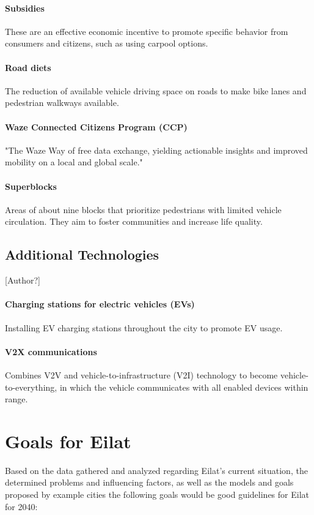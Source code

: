 \documentclass[12pt]{article}                         %
\begin{document}
\paragraph{Subsidies} These are an effective economic incentive to promote specific behavior from consumers and citizens, such as using carpool options.

\paragraph{Road diets} The reduction of available vehicle driving space on roads to make bike lanes and pedestrian walkways available.

\paragraph{Waze Connected Citizens Program (CCP)} "The Waze Way of free data exchange, yielding actionable insights and improved mobility on a local and global scale."

\paragraph{Superblocks} Areas of about nine blocks that prioritize pedestrians with limited vehicle circulation. They aim to foster communities and increase life quality.

\subsection{Additional Technologies}[Author?]
\paragraph{Charging stations for electric vehicles (EVs)} Installing EV charging stations throughout the city to promote EV usage.

\paragraph{V2X communications} Combines V2V and vehicle-to-infrastructure (V2I) technology to become vehicle-to-everything, in which the vehicle communicates with all enabled devices within range.

\section{Goals for Eilat}
Based on the data gathered and analyzed regarding Eilat’s current situation, the determined problems and influencing factors, as well as the models and goals proposed by example cities the following goals would be good guidelines for Eilat for 2040:
\end{document}
